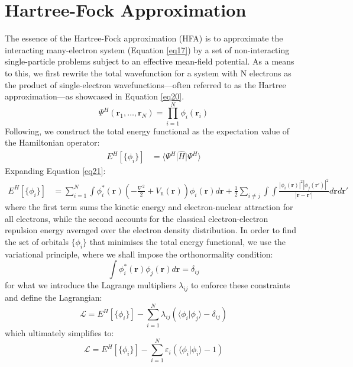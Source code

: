 
\section{Hartree-Fock Approximation}
The essence of the Hartree-Fock approximation (HFA) is to approximate the interacting many-electron system (Equation \ref{eq17}) by a set of non-interacting single-particle problems subject to an effective mean-field potential\supercite{martin2016interacting, helgaker2014molecular, feng2005introduction}. As a means to this, we first rewrite the total wavefunction for a system with N electrons as the product of single-electron wavefunctions---often referred to as the Hartree approximation\supercite{Hartree1928}---as showcased in Equation \ref{eq20}. 
\begin{equation}
  \Psi^H(\mathbf{r}_1, \dots, \mathbf{r}_N) = \prod_{i=1}^N \phi_i(\mathbf{r}_i)
  \label{eq20}
\end{equation}
Following, we construct the total energy functional as the expectation value of the Hamiltonian operator:
\begin{equation}
  \label{eq21}
\begin{aligned}
  E^{H}[\{\phi_i\}] &= \bigg\langle \Psi^H \bigg| \hat{H} \bigg| \Psi^H \bigg\rangle 
\end{aligned}
\end{equation}
Expanding Equation \ref{eq21}:
\begin{equation}
  \label{eq22}
  \begin{split}
    E^{H}[\{\phi_i\}] &= \sum^N_{i=1} \int \phi_i^*(\mathbf{r}) \left(-\frac{\nabla^2}{2} + V_{\text{n}}(\mathbf{r})\right) \phi_i(\mathbf{r}) d\mathbf{r}  + \frac{1}{2} \sum_{i\neq j} \int\int \frac{|\phi_i(\mathbf{r})|^2 |\phi_j(\mathbf{r'})|^2 }{|\mathbf{r} - \mathbf{r'}|} d\mathbf{r} d\mathbf{r'}
  \end{split}
\end{equation}
where the first term sums the kinetic energy and electron-nuclear attraction for all electrons, while the second accounts for the classical electron-electron repulsion energy averaged over the electron density distribution. In order to find the set of orbitals $\{\phi_i\}$ that minimises the total energy functional, we use the variational principle, where we shall impose the orthonormality condition: 
\begin{equation}
  \label{eq23}
  \int \phi_i^*(\mathbf{r}) \phi_j(\mathbf{r}) d\mathbf{r} = \delta_{ij}
\end{equation}
for what we introduce the Lagrange multipliers $\lambda_{ij}$ to enforce these constraints and define the Lagrangian:
\begin{equation}
  \label{eq24}
  \mathcal{L} = E^H[\{\phi_i\}] - \sum_{i=1}^{N}\lambda_{ij} ( \langle\phi_i|\phi_j\rangle - \delta_{ij})
\end{equation}
which ultimately simplifies to:
\begin{equation}
  \label{eq25}
  \mathcal{L} = E^H[\{\phi_i\}] - \sum_{i=1}^{N}\varepsilon_{i} ( \langle\phi_i|\phi_i\rangle - 1)
\end{equation}

